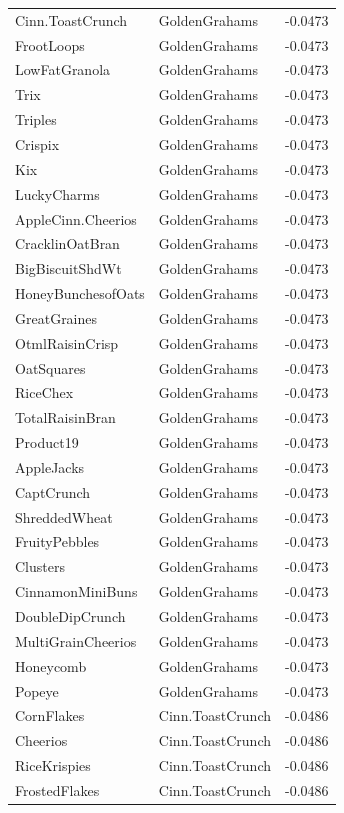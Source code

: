 \begin{table}[!htbp]
\begin{tabular}{lll}
Cinn.ToastCrunch & GoldenGrahams & -0.0473
\\
FrootLoops & GoldenGrahams & -0.0473
\\
LowFatGranola & GoldenGrahams & -0.0473
\\
Trix & GoldenGrahams & -0.0473
\\
Triples & GoldenGrahams & -0.0473
\\
Crispix & GoldenGrahams & -0.0473
\\
Kix & GoldenGrahams & -0.0473
\\
LuckyCharms & GoldenGrahams & -0.0473
\\
AppleCinn.Cheerios & GoldenGrahams & -0.0473
\\
CracklinOatBran & GoldenGrahams & -0.0473
\\
BigBiscuitShdWt & GoldenGrahams & -0.0473
\\
HoneyBunchesofOats & GoldenGrahams & -0.0473
\\
GreatGraines & GoldenGrahams & -0.0473
\\
OtmlRaisinCrisp & GoldenGrahams & -0.0473
\\
OatSquares & GoldenGrahams & -0.0473
\\
RiceChex & GoldenGrahams & -0.0473
\\
TotalRaisinBran & GoldenGrahams & -0.0473
\\
Product19 & GoldenGrahams & -0.0473
\\
AppleJacks & GoldenGrahams & -0.0473
\\
CaptCrunch & GoldenGrahams & -0.0473
\\
ShreddedWheat & GoldenGrahams & -0.0473
\\
FruityPebbles & GoldenGrahams & -0.0473
\\
Clusters & GoldenGrahams & -0.0473
\\
CinnamonMiniBuns & GoldenGrahams & -0.0473
\\
DoubleDipCrunch & GoldenGrahams & -0.0473
\\
MultiGrainCheerios & GoldenGrahams & -0.0473
\\
Honeycomb & GoldenGrahams & -0.0473
\\
Popeye & GoldenGrahams & -0.0473
\\
CornFlakes & Cinn.ToastCrunch & -0.0486
\\
Cheerios & Cinn.ToastCrunch & -0.0486
\\
RiceKrispies & Cinn.ToastCrunch & -0.0486
\\
FrostedFlakes & Cinn.ToastCrunch & -0.0486
\\

\end{tabular}
\end{table}
